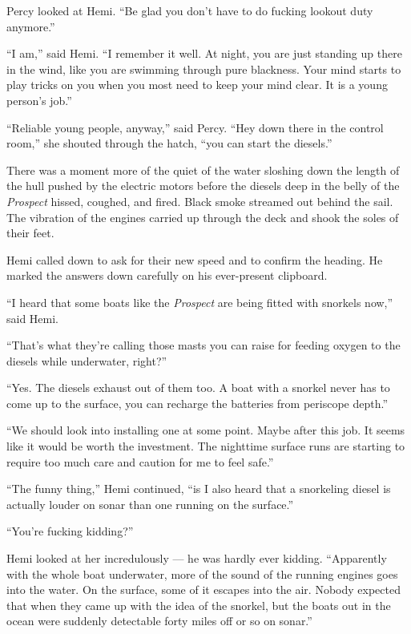 \documentclass[
]{scrbook}
\begin{document}
Percy looked at Hemi. ``Be glad you don't have to do fucking lookout
duty anymore.''

``I am,'' said Hemi. ``I remember it well. At night, you are just
standing up there in the wind, like you are swimming through pure
blackness. Your mind starts to play tricks on you when you most need to
keep your mind clear. It is a young person's job.''

``Reliable young people, anyway,'' said Percy. ``Hey down there in the
control room,'' she shouted through the hatch, ``you can start the
diesels.''

There was a moment more of the quiet of the water sloshing down the
length of the hull pushed by the electric motors before the diesels deep
in the belly of the \emph{Prospect} hissed, coughed, and fired. Black
smoke streamed out behind the sail. The vibration of the engines carried
up through the deck and shook the soles of their feet.

Hemi called down to ask for their new speed and to confirm the heading.
He marked the answers down carefully on his ever-present clipboard.

``I heard that some boats like the \emph{Prospect} are being fitted with
snorkels now,'' said Hemi.

``That's what they're calling those masts you can raise for feeding
oxygen to the diesels while underwater, right?''

``Yes. The diesels exhaust out of them too. A boat with a snorkel never
has to come up to the surface, you can recharge the batteries from
periscope depth.''

``We should look into installing one at some point. Maybe after this
job. It seems like it would be worth the investment. The nighttime
surface runs are starting to require too much care and caution for me to
feel safe.''

``The funny thing,'' Hemi continued, ``is I also heard that a snorkeling
diesel is actually louder on sonar than one running on the surface.''

``You're fucking kidding?''

Hemi looked at her incredulously --- he was hardly ever kidding.
``Apparently with the whole boat underwater, more of the sound of the
running engines goes into the water. On the surface, some of it escapes
into the air. Nobody expected that when they came up with the idea of
the snorkel, but the boats out in the ocean were suddenly detectable
forty miles off or so on sonar.''
\end{document}
